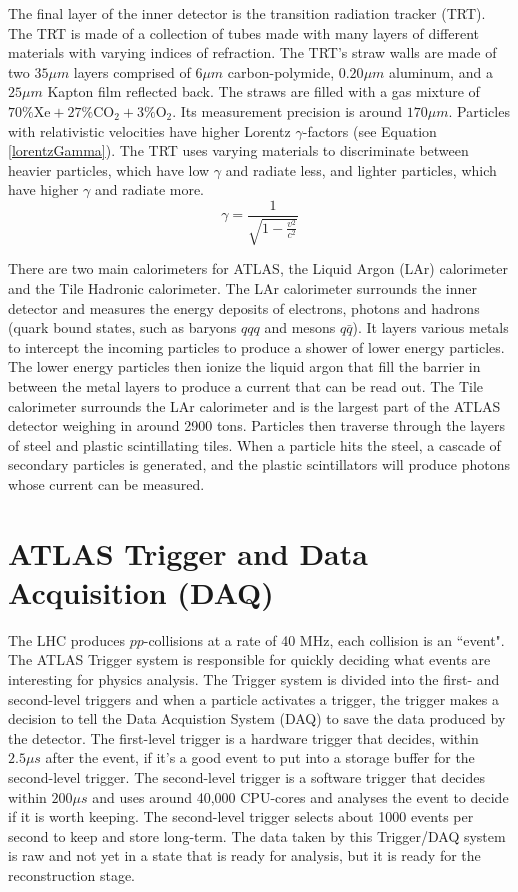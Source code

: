 The final layer of the inner detector is the transition radiation tracker (TRT). 
The TRT is made of a collection of tubes made with many layers of different materials with varying indices of refraction.
The TRT's straw walls are made of two $35\mu m$ layers comprised of $6\mu m$ carbon-polymide, $0.20 \mu m$ aluminum, and a $25\mu m$ Kapton film reflected back.\cite{TRT_2008}
The straws are filled with a gas mixture of $70\% \text{Xe} + 27\% \text{CO}_2 + 3\% \text{O}_2$. 
Its measurement precision is around $170 \mu m$. 
Particles with relativistic velocities have higher Lorentz $\gamma$-factors (see Equation \eqref{lorentzGamma}). 
The TRT uses varying materials to discriminate between heavier particles, which have low $\gamma$ and radiate less, and lighter particles, which have higher $\gamma$ and radiate more.\cite{Mindur:2139567}
\begin{equation}\label{lorentzGamma}
    \gamma = \frac{1}{\sqrt{1 - \frac{v^2}{c^2}}}
\end{equation}

There are two main calorimeters for ATLAS, the Liquid Argon (LAr) calorimeter and the Tile Hadronic calorimeter.
The LAr calorimeter surrounds the inner detector and measures the energy deposits of electrons, photons and hadrons (quark bound states, such as baryons $qqq$ and mesons $q\bar{q}$). 
It layers various metals to intercept the incoming particles to produce a shower of lower energy particles. 
The lower energy particles then ionize the liquid argon that fill the barrier in between the metal layers to produce a current that can be read out.
The Tile calorimeter surrounds the LAr calorimeter and is the largest part of the ATLAS detector weighing in around 2900 tons. 
Particles then traverse through the layers of steel and plastic scintillating tiles. 
When a particle hits the steel, a cascade of secondary particles is generated, and the plastic scintillators will produce photons whose current can be measured.

\section{ATLAS Trigger and Data Acquisition (DAQ)}

The LHC produces $pp$-collisions at a rate of 40 MHz, each collision is an ``event". 
The ATLAS Trigger system is responsible for quickly deciding what events are interesting for physics analysis.
The Trigger system is divided into the first- and second-level triggers and when a particle activates a trigger, the trigger makes a decision to tell the Data Acquistion System (DAQ) to save the data produced by the detector. 
The first-level trigger is a hardware trigger that decides, within $2.5 \mu s$ after the event, if it's a good event to put into a storage buffer for the second-level trigger.
The second-level trigger is a software trigger that decides within $200 \mu s$ and uses around 40,000 CPU-cores and analyses the event to decide if it is worth keeping. 
The second-level trigger selects about 1000 events per second to keep and store long-term.\cite{Trigger-DAQ}
The data taken by this Trigger/DAQ system is raw and not yet in a state that is ready for analysis, but it is ready for the reconstruction stage. 

